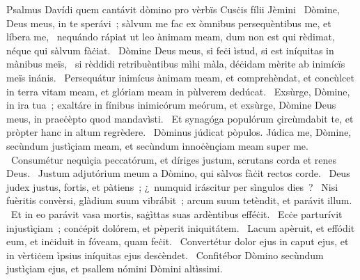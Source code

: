 { Psalmus Davídi quem cantávit dòmino pro vèrbïs Cusċis fílii Jèmini}
{%
~Dòmine, Deus meus, in te sperávi~; sàlvum me fac ex òmnibus persequèntibus me, et líbera me,
~nequándo rápiat ut leo ànimam meam, dum non est qui rèdimat, néque qui sàlvum fàċiat.
~Dòmine Deus meus, si feċi ìstud, si est iníquitas in mànibus meïs,
~si rèddidi retribuèntibus mìhi màla, déċidam mèrite ab inimícïs meïs inánis.
~Persequátur inimícus ànimam meam, et comprehèndat, et concùlcet in terra vitam meam, et glóriam meam in pùlverem dedúcat.
~Exsùrge, Dòmine, in ira tua~; exaltáre in fínibus inimicórum meórum, et exsùrge, Dòmine Deus meus, in praeċèpto quod mandavìsti.
~Et synagóga populórum çircùmdabit te, et pròpter hanc in altum regrèdere.
~Dòminus júdicat pòpulos. Júdica me, Dòmine, secùndum justìçiam meam, et secùndum innoċènçiam meam super me.
~Consumétur nequìçia peccatórum, et díriges justum, scrutans corda et renes Deus.
~Justum adjutórium meum a Dòmino, qui sàlvos fàċit rectos corde.
~Deus judex justus, fortis, et pàtiens~; ¿~numquid iráscitur per sìngulos dies~?
~Nisi fuèritis convèrsi, glàdium suum vibrábit~; arcum suum tetèndit, et parávit illum.
~Et in eo parávit vasa mortis, saġìttas suas ardèntibus efféċit.
~Ecċe parturívit injustìçiam~; conċépit dolórem, et pèperit iniquitátem.
~Lacum apèruit, et effódit eum, et inċiduit in fóveam, quam feċit.
~Convertétur dolor ejus in caput ejus, et in vèrtiċem ìpsius iníquitas ejus desċèndet.
~Confitébor Dòmino secùndum justìçiam ejus, et psallem nómini Dòmini altìssimi.
}
